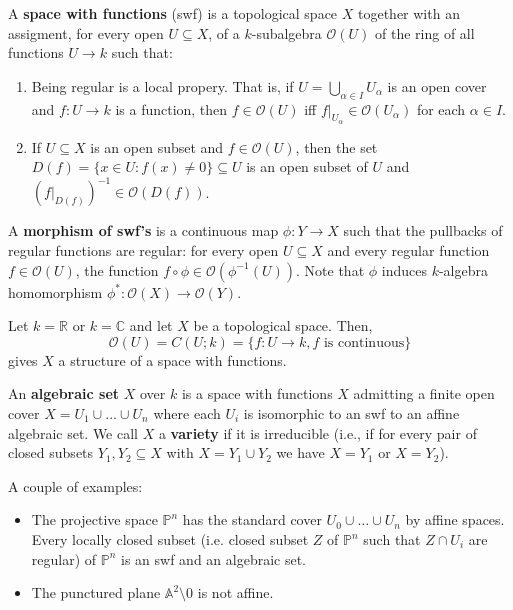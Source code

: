 \documentclass{template}
\begin{document}
\begin{definition}
    A \textbf{space with functions} (swf) is a topological space $X$ together 
    with an assigment, for every open $U \subseteq X$, of a $k$-subalgebra 
    $\mathcal{O}(U)$ of the ring of all functions $U \to k$ such that:
    \begin{enumerate}
        \item[(a)] Being regular is a local propery. That is, if $U = \bigcup_{\alpha \in I} U_{\alpha}$
        is an open cover and $f: U \to k$ is a function, then $f \in \mathcal{O}(U)$ iff 
        $f|_{U_{\alpha}} \in \mathcal{O}(U_{\alpha})$ for each $\alpha \in I$.
        \item[(b)] If $U \subseteq X$ is an open subset and $f \in \mathcal{O}(U)$, then 
        the set $D(f) = \{x \in U: f(x) \neq 0\} \subseteq U$ is an open subset of $U$
        and $(f|_{D(f)})^{-1} \in \mathcal{O}(D(f))$.
    \end{enumerate}

    A \textbf{morphism of swf's} is a continuous map $\phi: Y \to X$ such that
    the pullbacks of regular functions are regular: for every open $U \subseteq
    X$ and every regular function $f \in \mathcal{O}(U)$, the function $f \circ
    \phi \in \mathcal{O}(\phi^{-1}(U))$. Note that $\phi$ induces $k$-algebra
    homomorphism $\phi^*: \mathcal{O}(X) \to \mathcal{O}(Y)$.
\end{definition}

\begin{example}
    Let $k=\mathbb{R}$ or $k=\mathbb{C}$ and let $X$ be a topological space.
    Then, 
    $$\mathcal{O}(U) = C(U;k) = \{f: U \to k, \text{$f$ is continuous}\}$$
    gives $X$ a structure of a space with functions.
\end{example}

\begin{definition}
    An \textbf{algebraic set} $X$ over $k$ is a space with functions $X$ admitting
    a finite open cover $X = U_1 \cup \dots \cup U_n$ where each $U_i$ is isomorphic
    to an swf to an affine algebraic set. We call $X$ a \textbf{variety} if it 
    is irreducible (i.e., if for every pair of closed subsets $Y_1,Y_2 \subseteq X$
    with $X = Y_1 \cup Y_2$ we have $X=Y_1$ or $X=Y_2$).
\end{definition}

\begin{example}
    A couple of examples:
    \begin{itemize}
        \item The projective space $\mathbb{P}^n$ has the standard cover 
        $U_0 \cup \dots \cup U_n$ by affine spaces. Every locally closed 
        subset (i.e. closed subset $Z$ of $\mathbb{P}^n$ such that $Z \cap U_i$
        are regular) of $\mathbb{P}^n$ is an swf and an algebraic set.
        \item The punctured plane $\mathbb{A}^2 \setminus 0$ is not affine.
    \end{itemize}
\end{example}
\end{document}
